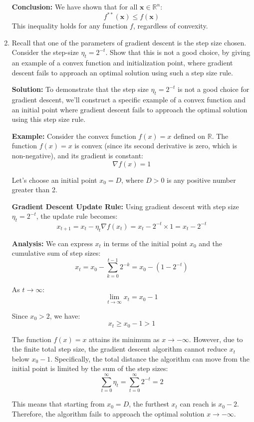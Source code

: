 \documentclass{article}
\begin{document}
\begin{enumerate}
    \textbf{Conclusion:} We have shown that for all $\mathbf{x} \in \mathbb{R}^n$:
    \[
    f^{**}(\mathbf{x}) \leq f(\mathbf{x})
    \]
    This inequality holds for any function $f$, regardless of convexity.
    
    \item Recall that one of the parameters of gradient descent is the step size chosen. Consider the step-size $\eta_t = 2^{-t}$. Show that this is not a good choice, by giving an example of a convex function and initialization point, where gradient descent fails to approach an optimal solution using such a step size rule.
    
    \textbf{Solution:} To demonstrate that the step size $\eta_t = 2^{-t}$ is not a good choice for gradient descent, we'll construct a specific example of a convex function and an initial point where gradient descent fails to approach the optimal solution using this step size rule.

    \textbf{Example:}
    Consider the convex function $f(x) = x$ defined on $\mathbb{R}$. The function $f(x) = x$ is convex (since its second derivative is zero, which is non-negative), and its gradient is constant:
    \[
    \nabla f(x) = 1
    \]

    Let's choose an initial point $x_0 = D$, where $D > 0$ is any positive number greater than 2.

    \textbf{Gradient Descent Update Rule:}
    Using gradient descent with step size $\eta_t = 2^{-t}$, the update rule becomes:
    \[
    x_{t+1} = x_t - \eta_t \nabla f(x_t) = x_t - 2^{-t} \times 1 = x_t - 2^{-t}
    \]

    \textbf{Analysis:}
    We can express $x_t$ in terms of the initial point $x_0$ and the cumulative sum of step sizes:
    \[
    x_t = x_0 - \sum_{k=0}^{t-1} 2^{-k} = x_0 - \left(1 - 2^{-t}\right)
    \]

    As $t \to \infty$:
    \[
    \lim_{t \to \infty} x_t = x_0 - 1
    \]

    Since $x_0 > 2$, we have:
    \[
    x_t \geq x_0 - 1 > 1
    \]

    The function $f(x) = x$ attains its minimum as $x \to -\infty$. However, due to the finite total step size, the gradient descent algorithm cannot reduce $x_t$ below $x_0 - 1$. Specifically, the total distance the algorithm can move from the initial point is limited by the sum of the step sizes:
    \[
    \sum_{t=0}^{\infty} \eta_t = \sum_{t=0}^{\infty} 2^{-t} = 2
    \]

    This means that starting from $x_0 = D$, the furthest $x_t$ can reach is $x_0 - 2$. Therefore, the algorithm fails to approach the optimal solution $x \to -\infty$.


\end{enumerate}
\end{document}
